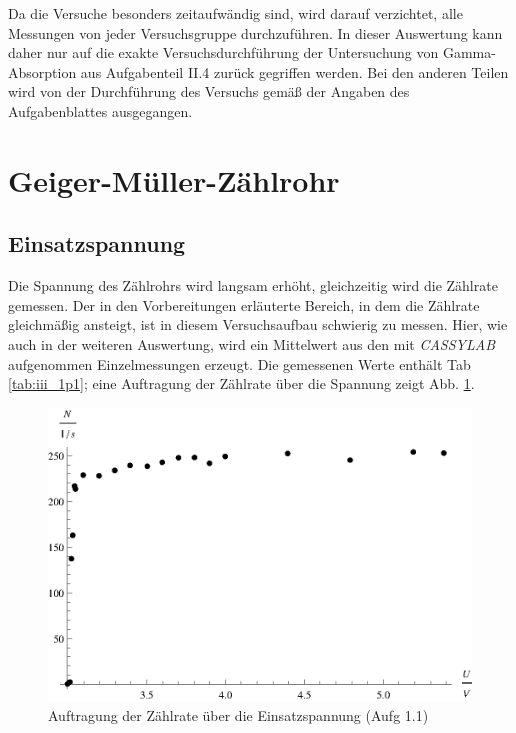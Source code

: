 Da die Versuche besonders zeitaufwändig sind, wird darauf verzichtet, alle Messungen von jeder Versuchsgruppe durchzuführen. In dieser Auswertung kann daher nur auf die exakte Versuchsdurchführung der Untersuchung von Gamma-Absorption aus Aufgabenteil II.4 zurück gegriffen werden. Bei den anderen Teilen wird von der Durchführung des Versuchs gemäß der Angaben des Aufgabenblattes ausgegangen.

\section{Geiger-Müller-Zählrohr}
\subsection{Einsatzspannung}
Die Spannung des Zählrohrs wird langsam erhöht, gleichzeitig wird die Zählrate gemessen. Der in den Vorbereitungen erläuterte Bereich, in dem die Zählrate gleichmäßig ansteigt, ist in diesem Versuchsaufbau schwierig zu messen. Hier, wie auch in der weiteren Auswertung, wird ein Mittelwert aus den mit \textit{CASSYLAB} aufgenommen Einzelmessungen erzeugt. Die gemessenen Werte enthält Tab \ref{tab:iii_1p1}; eine Auftragung der Zählrate über die Spannung zeigt Abb. \ref{fig:iii_1p1}.

\begin{table}[tb]
	\centering
	\caption{Messung der Zählrate über die Einsatzspannung (Aufg 1.1)}
	\label{tab:iii_1p1}
	
\end{table}

\begin{figure}[tb]
	\centering
	\includegraphics[scale=1.0]{fig/iii_1p1.eps}
	\caption{Auftragung der Zählrate über die Einsatzspannung (Aufg 1.1)}
	\label{fig:iii_1p1}
\end{figure}

